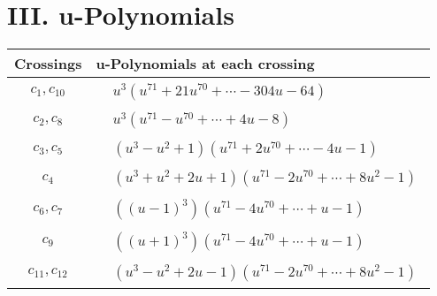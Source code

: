 \documentclass[1p]{elsarticle_modified}
\theoremstyle{definition}
\begin{document}
\newpage\renewcommand{\arraystretch}{1}
\centering \section*{ III. u-Polynomials}
\begin{tabular}{m{50pt}|m{274pt}}
Crossings & \hspace{64pt}u-Polynomials at each crossing \\
\hline $$\begin{aligned}c_{1},c_{10}\end{aligned}$$&$\begin{aligned}
&u^3(u^{71}+21 u^{70}+\cdots-304 u-64)
\end{aligned}$\\
\hline $$\begin{aligned}c_{2},c_{8}\end{aligned}$$&$\begin{aligned}
&u^3(u^{71}- u^{70}+\cdots+4 u-8)
\end{aligned}$\\
\hline $$\begin{aligned}c_{3},c_{5}\end{aligned}$$&$\begin{aligned}
&(u^3- u^2+1)(u^{71}+2 u^{70}+\cdots-4 u-1)
\end{aligned}$\\
\hline $$\begin{aligned}c_{4}\end{aligned}$$&$\begin{aligned}
&(u^3+u^2+2 u+1)(u^{71}-2 u^{70}+\cdots+8 u^2-1)
\end{aligned}$\\
\hline $$\begin{aligned}c_{6},c_{7}\end{aligned}$$&$\begin{aligned}
&((u-1)^3)(u^{71}-4 u^{70}+\cdots+u-1)
\end{aligned}$\\
\hline $$\begin{aligned}c_{9}\end{aligned}$$&$\begin{aligned}
&((u+1)^3)(u^{71}-4 u^{70}+\cdots+u-1)
\end{aligned}$\\
\hline $$\begin{aligned}c_{11},c_{12}\end{aligned}$$&$\begin{aligned}
&(u^3- u^2+2 u-1)(u^{71}-2 u^{70}+\cdots+8 u^2-1)
\end{aligned}$\\
\hline
\end{tabular}\newpage\renewcommand{\arraystretch}{1}
\end{document}
